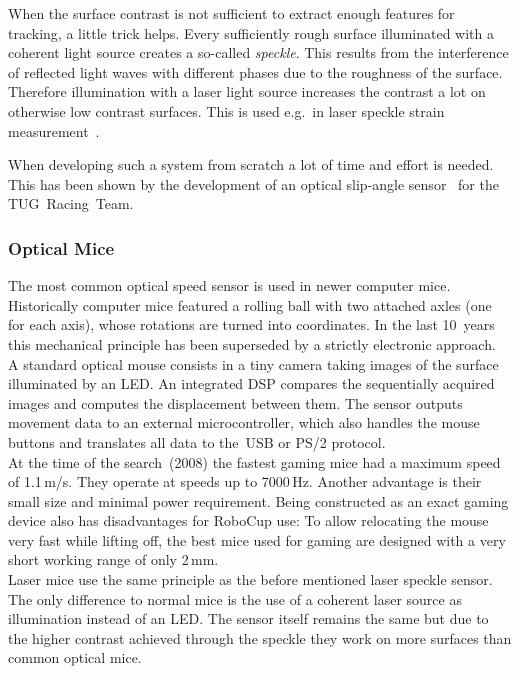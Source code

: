 \documentclass[12pt,a4paper]{article}
\begin{document}
When the surface contrast is not sufficient to extract enough features for tracking, a little trick helps.
Every sufficiently rough surface illuminated with a coherent light source creates a so-called \emph{speckle}.
This results from the interference of reflected light waves with different phases due to the roughness of the surface.
Therefore illumination with a laser light source increases the contrast a lot on otherwise low contrast surfaces.
This is used e.g.\ in laser speckle strain measurement~\cite{strain}.

When developing such a system from scratch a lot of time and effort is needed.
This has been shown by the development of an optical slip-angle sensor~\cite{Hrach2006} for the TUG~Racing~Team.

\subsubsection{Optical Mice}

The most common optical speed sensor is used in newer computer mice.
Historically computer mice featured a rolling ball with two attached axles (one for each axis), whose rotations are turned into coordinates.
In the last 10~years this mechanical principle has been superseded by a strictly electronic approach.\\
A standard optical mouse consists in a tiny camera taking images of the surface illuminated by an LED.
An integrated DSP compares the sequentially acquired images and computes the displacement between them.
The sensor outputs movement data to an external microcontroller, which also handles the mouse buttons and translates all data to the~USB or PS/2 protocol.\\
At the time of the search~(2008) the fastest gaming mice had a maximum speed of 1.1\,m/s.
They operate at speeds up to 7000\,Hz.
Another advantage is their small size and minimal power requirement.
Being constructed as an exact gaming device also has disadvantages for RoboCup use:
To allow relocating the mouse very fast while lifting off, the best mice used for gaming are designed with a very short working range of only 2\,mm.\\
Laser mice use the same principle as the before mentioned laser speckle sensor.
The only difference to normal mice is the use of a coherent laser source as illumination instead of an LED.
The sensor itself remains the same but due to the higher contrast achieved through the speckle they work on more surfaces than common optical mice.
\end{document}
